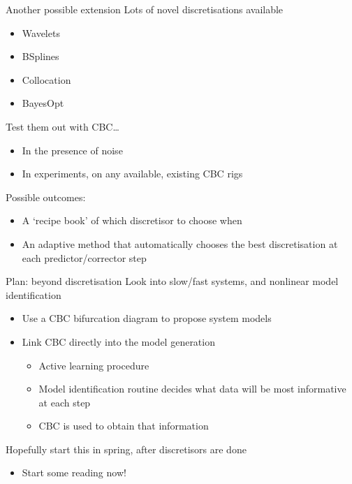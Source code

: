 \documentclass[presentation]{beamer}
\begin{document}
\begin{frame}[label={sec:orga3462ec}]{Another possible extension}
Lots of novel discretisations available
\begin{itemize}
\item Wavelets
\item BSplines
\item Collocation
\item BayesOpt
\end{itemize}
\vfill 
Test them out with CBC\ldots{}
\begin{itemize}
\item In the presence of noise
\item In experiments, on any available, existing CBC rigs
\end{itemize}
\vfill 
Possible outcomes: 
\begin{itemize}
\item A `recipe book' of which discretisor to choose when
\item An adaptive method that automatically chooses the best discretisation at each predictor/corrector step
\end{itemize}
\end{frame}

\begin{frame}[label={sec:orge89b414}]{Plan: beyond discretisation}
Look into slow/fast systems, and nonlinear model identification
\vfill
\begin{itemize}
\item Use a CBC bifurcation diagram to propose system models
\item Link CBC directly into the model generation
\begin{itemize}
\item Active learning procedure
\item Model identification routine decides what data will be most informative at each step
\item CBC is used to obtain that information
\end{itemize}
\end{itemize}
\vfill
Hopefully start this in spring, after discretisors are done
\begin{itemize}
\item Start some reading now!
\end{itemize}
\end{frame}
\end{document}
